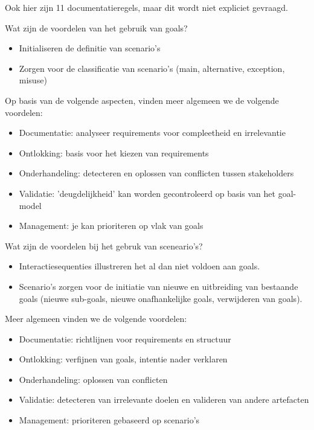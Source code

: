 \documentclass{article}
\begin{document}
Ook hier zijn 11 documentatieregels, maar dit wordt niet expliciet gevraagd.

\begin{quest}{}Wat zijn de voordelen van het gebruik van goals?
\end{quest}
\begin{itemize}
    \item Initialiseren de definitie van scenario's
    \item Zorgen voor de classificatie van scenario's (main, alternative, exception, misuse)
\end{itemize}
Op basis van de volgende aspecten, vinden meer algemeen we de volgende voordelen:
\begin{itemize}
    \item Documentatie: analyseer requirements voor compleetheid en irrelevantie
    \item Ontlokking: basis voor het kiezen van requirements
    \item Onderhandeling: detecteren en oplossen van conflicten tussen stakeholders
    \item Validatie: 'deugdelijkheid' kan worden gecontroleerd op basis van het goal-model
    \item Management: je kan prioriteren op vlak van goals
\end{itemize}
\begin{quest}Wat zijn de voordelen bij het gebruk van sceneario's?\end{quest}
\begin{itemize}
\item Interactiesequenties illustreren het al dan niet voldoen aan goals.
\item Scenario's zorgen voor de initiatie van nieuwe en uitbreiding van bestaande goals (nieuwe sub-goals, nieuwe onafhankelijke goals, verwijderen van goals).
\end{itemize}
Meer algemeen vinden we de volgende voordelen:
\begin{itemize}
    \item Documentatie: richtlijnen voor requirements en structuur
    \item Ontlokking: verfijnen van goals, intentie nader verklaren
    \item Onderhandeling: oplossen van conflicten
    \item Validatie: detecteren van irrelevante doelen en valideren van andere artefacten
    \item Management: prioriteren gebaseerd op scenario's
\end{itemize}
\end{document}
